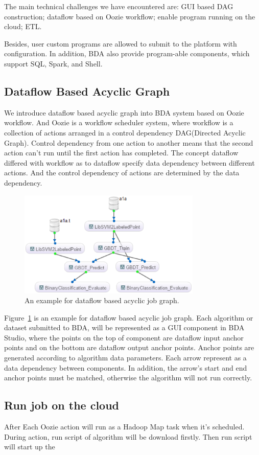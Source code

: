 \documentclass{sig-alternate-05-2015}
\begin{document}
The main technical challenges we have encountered are: GUI based DAG construction; dataflow based on Oozie workflow; enable program running on the cloud; ETL.

Besides, user custom programs are allowed to submit to the platform with configuration. In addition, BDA also provide program-able components, which support SQL, Spark, and Shell. 


\subsection{Dataflow Based Acyclic Graph}
We introduce dataflow based acyclic graph into BDA system based on Oozie workflow. And Oozie is a workflow scheduler system, where workflow is a collection of actions arranged in a control dependency DAG(Directed Acyclic Graph). Control dependency from one action to another means that the second action can't run until the first action has completed. The concept dataflow differed with workflow as to dataflow specify data dependency between different actions. And the control dependency of actions are determined by the data dependency.


\begin{figure}
\centering
\includegraphics[height=2in]{DAG.eps}
\caption{ An example for dataflow based acyclic job graph.}
\label{fig:dag}
\end{figure}

Figure~\ref{fig:dag} is an example for dataflow based acyclic job graph. Each algorithm or dataset submitted to BDA, will be represented as a GUI component in BDA Studio, where the points on the top of component are dataflow input anchor points and on the bottom are dataflow output anchor points. Anchor points are generated according to algorithm data parameters. Each arrow represent as a data dependency between components. In addition, the arrow's start and end anchor points must be matched, otherwise the algorithm will not run correctly.

\subsection{Run job on the cloud}
After 
Each Oozie action will run as a Hadoop Map task when it's scheduled. During action, run script of algorithm will be download firstly. Then run script will start up the 
\end{document}
